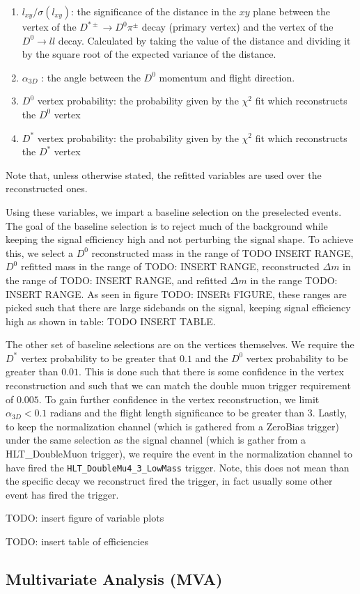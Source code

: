 \begin{enumerate}
    \item $l_{xy}/\sigma\left(l_{xy}\right)$: the significance of the distance in the $xy$ plane between the vertex of the $D^{*\pm} \to D^0 \pi^\pm$ decay (primary vertex) and the vertex of the $D^0 \to l l$ decay. Calculated by taking the value of the distance and dividing it by the square root of the expected variance of the distance. 
    \item $\alpha_{3D}$ : the angle between the $D^0$ momentum and flight direction. 
    \item $D^0$ vertex probability: the probability given by the $\chi^2$ fit which reconstructs the $D^0$ vertex 
    \item $D^*$ vertex probability: the probability given by the $\chi^2$ fit which reconstructs the $D^*$ vertex
\end{enumerate}
Note that, unless otherwise stated, the refitted variables are used over the reconstructed ones. 

Using these variables, we impart a baseline selection on the preselected events. The goal of the baseline selection is to reject much of the background while keeping the signal efficiency high and not perturbing the signal shape. To achieve this, we select a $D^0$ reconstructed mass in the range of TODO INSERT RANGE, $D^0$ refitted mass in the range of TODO: INSERT RANGE, reconstructed $\Delta m$ in the range of TODO: INSERT RANGE, and refitted $\Delta m$ in the range TODO: INSERT RANGE. As seen in figure TODO: INSERt FIGURE, these ranges are picked such that there are large sidebands on the signal, keeping signal efficiency high as shown in table: TODO INSERT TABLE.

The other set of baseline selections are on the vertices themselves. We require the $D^*$ vertex probability to be greater that $0.1$ and the $D^0$ vertex probability to be greater than $0.01$. This is done such that there is some confidence in the vertex reconstruction and such that we can match the double muon trigger requirement of $0.005$. To gain further confidence in the vertex reconstruction, we limit $\alpha_{3D} < 0.1$ radians and the flight length significance to be greater than 3. Lastly, to keep the normalization channel (which is gathered from a ZeroBias trigger) under the same selection as the signal channel (which is gather from a HLT\_DoubleMuon trigger), we require the event in the normalization channel to have fired the \texttt{HLT\_DoubleMu4\_3\_LowMass} trigger. Note, this does not mean than the specific decay we reconstruct fired the trigger, in fact usually some other event has fired the trigger. 

TODO: insert figure of variable plots

TODO: insert table of efficiencies


\subsection{Multivariate Analysis (MVA)}



